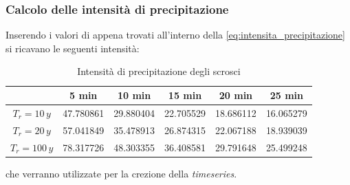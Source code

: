 \documentclass{beamer}
\begin{document}
\begin{frame}
 \frametitle{Calcolo delle intensità di precipitazione}
 Inserendo i valori di appena trovati all'interno della \eqref{eq:intensita_precipitazione} si ricavano le seguenti intensità:
  \small
    \begin{table}
    \caption{Intensità di precipitazione degli scrosci}
    \begin{tabular}{cccccc}
    \toprule
    &5 min &      10 min &      15 min &      20 min &      25 min \\ 
    \midrule
    $T_r = 10\,y$ &47.780861 &  29.880404 &  22.705529 &  18.686112 &  16.065279 \\
    $T_r = 20\,y$ &57.041849 &  35.478913 &  26.874315 &  22.067188 &  18.939039 \\
    $T_r = 100\,y$ &78.317726 &  48.303355 &  36.408581 &  29.791648 &  25.499248 \\
    \bottomrule
    \end{tabular}
    \end{table}
    che verranno utilizzate per la crezione della \emph{timeseries}.
\end{frame}
\end{document}
